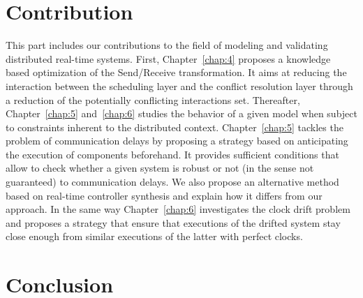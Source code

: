 \documentclass[a4paper,Times,twoside,index,12pt]{Classes/PhDThesisPSnPDF}
\begin{document}
\part{Contribution}
{\label{part:2}This part includes our contributions to the field of modeling and validating
distributed real-time systems. First, Chapter~\ref{chap:4} proposes a knowledge based
optimization of the Send/Receive transformation. It aims at reducing the interaction between
the scheduling layer and the conflict resolution layer through a reduction of the potentially
conflicting interactions set. Thereafter, Chapter~\ref{chap:5} and~\ref{chap:6} studies the 
behavior of a given model when subject to constraints inherent to the distributed context.
Chapter~\ref{chap:5} tackles the problem of communication delays by proposing a strategy based
on anticipating the execution of components beforehand. It provides sufficient conditions
that allow to check whether a given system is robust or not (in the sense not guaranteed) 
to communication delays. We also propose an alternative method based on real-time controller
synthesis and explain how it differs from our approach. 
In the same way Chapter~\ref{chap:6} investigates the clock drift problem and proposes a strategy
that ensure that executions of the drifted system stay close enough from similar executions
of the latter with perfect clocks.
}
%
%
%
%
%
\part{Conclusion}
{\label{part:3}}
%
\listoffigures 

\listoftables 



\begin{spacing}{0.9}



\cleardoublepage




\end{spacing}
\end{document}
